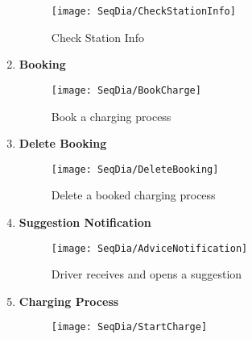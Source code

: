 \begin{enumerate}
\begin{figure}[H]
            \begin{center}
            \texttt{[image: SeqDia/CheckStationInfo]}
            \caption{Check Station Info}
            \label{fig:CheckStationInfo}
            \end{center}
        \end{figure}
        \newpage
        \item \textbf{Booking}
        \begin{figure}[H]
            \begin{center}
            \texttt{[image: SeqDia/BookCharge]}
            \caption{Book a charging process}
            \label{fig:BookCharge}
            \end{center}
        \end{figure}
        \newpage
        \item \textbf{Delete Booking}
        \begin{figure}[H]
            \begin{center}
            \texttt{[image: SeqDia/DeleteBooking]}
            \caption{Delete a booked charging process}
            \label{fig:DeleteBooking}
            \end{center}
        \end{figure}
        \item \textbf{Suggestion Notification}
        \begin{figure}[H]
            \begin{center}
            \texttt{[image: SeqDia/AdviceNotification]}
            \caption{Driver receives and opens a suggestion}
            \label{fig:AdviceNotification}
            \end{center}
        \end{figure}
        \newpage
        \item \textbf{Charging Process}
        \begin{figure}[H]
            \begin{center}
            \texttt{[image: SeqDia/StartCharge]}

\end{center}
\end{figure}
\end{enumerate}
